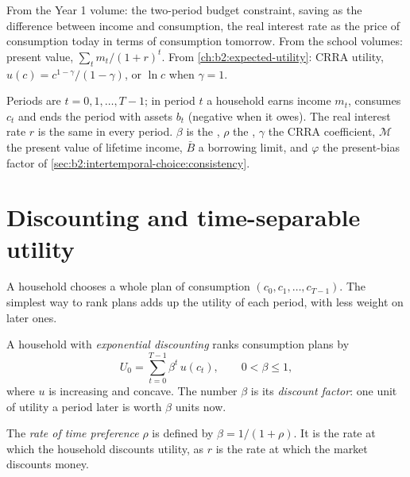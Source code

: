 \begin{recall}
From the Year 1 volume: the two-period budget constraint, saving as the difference between income and
consumption, the real interest rate as the price of consumption today in terms of consumption
tomorrow. From the school volumes: present value, $\sum_t m_t/(1+r)^t$. From
\cref{ch:b2:expected-utility}: CRRA utility, $u(c) = c^{1-\gamma}/(1-\gamma)$, or $\ln c$ when $\gamma
= 1$.
\end{recall}

\begin{notation}\label{not:b2:intertemporal-choice:symbols}
Periods are $t = 0, 1, \dots, T - 1$; in period $t$ a household earns income $m_t$, consumes $c_t$
and ends the period with assets $b_t$ (negative when it owes). The real interest rate $r$ is the same
in every period. $\beta$ is the , $\rho$ the , $\gamma$ the CRRA
coefficient, $\mathcal{M}$ the present value of lifetime income, $\bar B$ a borrowing limit, and
$\varphi$ the present-bias factor of \cref{sec:b2:intertemporal-choice:consistency}.
\end{notation}

\section{Discounting and time-separable utility}\label{sec:b2:intertemporal-choice:discounting}

A household chooses a whole plan of consumption $(c_0, c_1, \dots, c_{T-1})$. The simplest way to
rank plans adds up the utility of each period, with less weight on later ones.

\begin{definition}\label{def:b2:intertemporal-choice:discount-factor}
A household with \emph{exponential discounting} ranks consumption plans by
\[
U_0 = \sum_{t=0}^{T-1} \beta^{t}\, u(c_t), \qquad 0 < \beta \le 1,
\]
where $u$ is increasing and concave. The number $\beta$ is its \emph{discount
factor}: one unit of utility a period later is worth $\beta$ units now.
\end{definition}

\begin{definition}\label{def:b2:intertemporal-choice:time-preference}
The \emph{rate of time preference} $\rho$ is defined by $\beta = 1/(1 +
\rho)$. It is the rate at which the household discounts utility, as $r$ is the rate at which the market
discounts money.
\end{definition}

